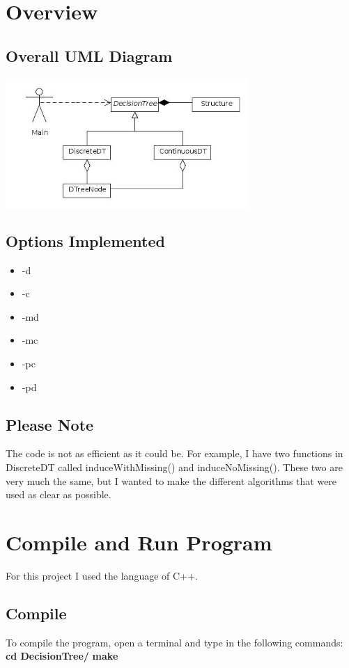 \documentclass[a4paper]{article}
\begin{document}

\tableofcontents
\newpage

\section{Overview}
	\subsection{Overall UML Diagram}
		\begin{center}
			\includegraphics[width=350px]{overview.jpg}	
		\end{center}
		
	\subsection{Options Implemented}
	\begin{itemize}
	\item -d
	\item -c
	\item -md
	\item -mc
	\item -pc
	\item -pd
	\end{itemize}		
	
	\subsection{Please Note}
	The code is not as efficient as it could be. For example, I have two functions in DiscreteDT called induceWithMissing() and induceNoMissing(). These two are very much the same, but I wanted to make the different algorithms that were used as clear as possible.
\section{Compile and Run Program}
For this project I used the language of C++.
	\subsection{Compile}
	To compile the program, open a terminal and type in the following commands:
	\newline
	\newline
	\textbf{cd DecisionTree/} \newline
	\textbf{make} 
	\newline
	\newline
	
\end{document}
